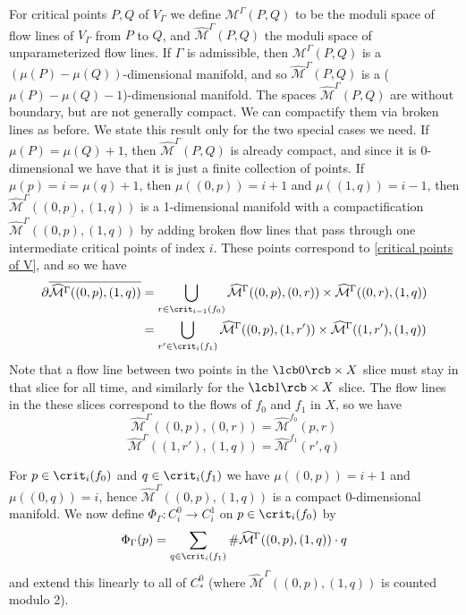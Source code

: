 For critical points $P,Q$ of $V_\Gamma$ we define $\mathcal M^\Gamma(P,Q)$ to be the moduli space of flow lines of $V_\Gamma$ from $P$ to $Q$, and $\widehat{\mathcal M}^\Gamma(P,Q)$ the moduli space of unparameterized flow lines. If $\Gamma$ is admissible, then $\mathcal M^\Gamma(P,Q)$ is a $(\mu(P)-\mu(Q))$-dimensional manifold, and so $\widehat{\mathcal M}^\Gamma(P,Q)$ is a ($\mu(P)-\mu(Q)-1$)-dimensional manifold. The spaces $\widehat{\mathcal M}^\Gamma(P,Q)$ are without boundary, but are not generally compact. We can compactify them via broken lines as before. We state this result only for the two special cases we need. If $\mu(P)=\mu(Q)+1$, then $\widehat{\mathcal M}^\Gamma(P,Q)$ is already compact, and since it is 0-dimensional we have that it is just a finite collection of points. If $\mu(p)=i=\mu(q)+1$, then $\mu((0,p))=i+1$ and $\mu((1,q))=i-1$, then $\widehat{\mathcal M}^\Gamma((0,p),(1,q))$ is a 1-dimensional manifold with a compactification $\overline{\widehat{\mathcal M}^\Gamma((0,p),(1,q))}$ by adding broken flow lines that pass through one intermediate critical points of index $i$. These points correspond to \cref{critical points of V}, and so we have
\begin{align*}
\partial \overline{\widehat{\mathcal M}^\Gamma((0,p),(1,q))} &= \bigcup_{r \in \crit_{i-1}(f_0)} \widehat{\mathcal M}^\Gamma((0,p),(0,r)) \times \widehat{\mathcal M}^\Gamma((0,r),(1,q)) \\
 &= \bigcup_{r' \in \crit_i(f_1)} \widehat{\mathcal M}^\Gamma((0,p),(1,r')) \times \widehat{\mathcal M}^\Gamma((1,r'),(1,q))
\end{align*}
Note that a flow line between two points in the $\lcb 0 \rcb \times X$ slice must stay in that slice for all time, and similarly for the $\lcb 1 \rcb \times X$ slice. The flow lines in the these slices correspond to the flows of $f_0$ and $f_1$ in $X$, so we have
\[ \widehat{\mathcal M}^\Gamma((0,p),(0,r)) = \widehat{\mathcal M}^{f_0}(p,r) \]
\[ \widehat{\mathcal M}^\Gamma((1,r'),(1,q)) = \widehat{\mathcal M}^{f_1}(r',q) \]

For $p \in \crit_i(f_0)$ and $q \in \crit_i(f_1)$ we have $\mu((0,p))=i+1$ and $\mu((0,q))=i$, hence $\widehat{\mathcal M}^\Gamma((0,p),(1,q))$ is a compact 0-dimensional manifold. We now define $\Phi_\Gamma : C_i^0 \rightarrow C_i^1$ on $p \in \crit_i(f_0)$ by
\[ \Phi_\Gamma(p) = \sum_{q \in \crit_i(f_1)} \# \widehat{\mathcal M}^\Gamma((0,p),(1,q)) \cdot q \]
and extend this linearly to all of $C_*^0$ (where $\widehat{\mathcal M}^\Gamma((0,p),(1,q))$ is counted modulo 2).

